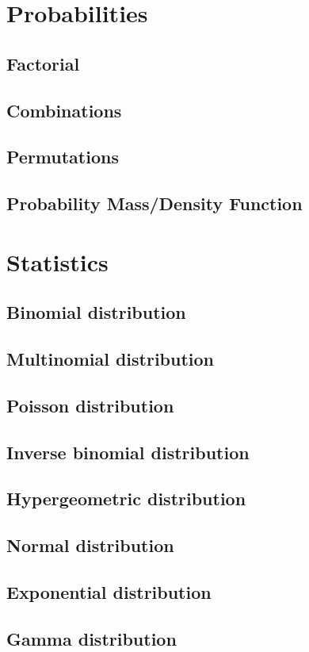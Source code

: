 \documentclass{report}
\begin{document}
\chapter{Probabilities}
	\section{Factorial}
	\section{Combinations}
	\section{Permutations}
	\section{Probability Mass/Density Function}

\chapter{Statistics}
	\section{Binomial distribution}
	\section{Multinomial distribution}
	\section{Poisson distribution}
	\section{Inverse binomial distribution}
	\section{Hypergeometric distribution}
	\section{Normal distribution}
	\section{Exponential distribution}
	\section{Gamma distribution}
\end{document}
